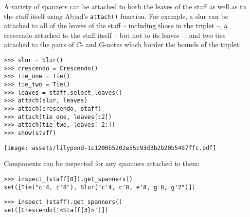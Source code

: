 \noindent A variety of spanners can be attached to both the leaves of the staff
as well as to the staff itself using Abjad's \texttt{attach()} function. For
example, a slur can be attached to all of the leaves of the staff -- including
those in the triplet --, a crescendo attached to the staff itself -- but not to
its leaves --, and two ties attached to the pairs of C- and G-notes which
border the bounds of the triplet:

\begin{comment}
<abjad>
slur = Slur()
crescendo = Crescendo()
tie_one = Tie()
tie_two = Tie()
leaves = staff.select_leaves()
attach(slur, leaves)
attach(crescendo, staff)
attach(tie_one, leaves[:2])
attach(tie_two, leaves[-2:])
show(staff)
</abjad>
\end{comment}

\begin{abjadbookoutput}
\begin{singlespacing}
\vspace{-0.5\baselineskip}
\begin{verbatim}
>>> slur = Slur()
>>> crescendo = Crescendo()
>>> tie_one = Tie()
>>> tie_two = Tie()
>>> leaves = staff.select_leaves()
>>> attach(slur, leaves)
>>> attach(crescendo, staff)
>>> attach(tie_one, leaves[:2])
>>> attach(tie_two, leaves[-2:])
>>> show(staff)
\end{verbatim}
\noindent\texttt{[image: assets/lilypond-1c1200b5202e55c93d3b2b20b5487ffc.pdf]}
\end{singlespacing}
\end{abjadbookoutput}

\noindent Components can be inspected for any spanners attached to them:

\begin{comment}
<abjad>
inspect_(staff[0]).get_spanners()
inspect_(staff).get_spanners()
</abjad>
\end{comment}

\begin{abjadbookoutput}
\begin{singlespacing}
\vspace{-0.5\baselineskip}
\begin{verbatim}
>>> inspect_(staff[0]).get_spanners()
set([Tie("c'4, c'8"), Slur("c'4, c'8, e'8, g'8, g'2")])
\end{verbatim}
\begin{verbatim}
>>> inspect_(staff).get_spanners()
set([Crescendo('<Staff{3}>')])
\end{verbatim}
\end{singlespacing}
\end{abjadbookoutput}

